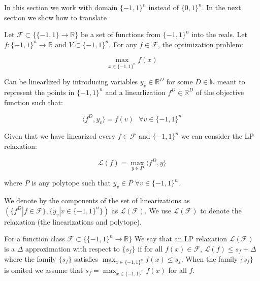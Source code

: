 In this section we work with domain $\{-1,1\}^n$ instead of $\{0,1\}^n$. In the next section we show how to translate 

\begin{definition}[Linearizations] Let $\mathcal{F} \subset \{ \{-1,1\} \rightarrow \mathbb{R}\}$ be a set of functions from $\{-1,1\}^n$ into the reals. Let $f : \{-1, 1\}^n \rightarrow \mathbb{R}$ and $V \subset \{-1, 1\}^n$.  For any $f \in \mathcal{F}$, the optimization problem:

\begin{equation}
\max_{x \in \{-1,1\}^n} f(x)
\end{equation}

Can be linearlized by introducing variables $y_v \in \mathbb{R}^D$ for some $D \in \mathbb{N}$ meant to represent the points in $\{-1,1\}^n$ and a linearlization $f^D \in \mathbb{R}^D$ of the objective function such that:

\begin{equation}
\langle f^D, y_v \rangle = f(v) \text{ } \forall v \in \{-1,1\}^n
\end{equation}

Given that we have linearized every $f \in \mathcal{F}$ and $\{-1,1\}^n$ we can consider the LP relaxation:

\begin{equation}
\mathcal{L}(f) = \max_{y \in P} \langle f^D, y \rangle
\end{equation}

where $P$ is any polytope such that $y_v \in P$ $\forall v \in \{-1,1\}^n$.

We denote by the components of the set of linearizations as $(\{f^D | f \in \mathcal{F}\}, \{y_v | v\in \{-1,1\}^n\})$ as $\mathcal{L}(\mathcal{F})$. We use $\mathcal{L}(\mathcal{F})$ to denote the relaxation (the linearizations and polytope).
\end{definition}


\begin{definition} For a function class $\mathcal{F} \subset \{ \{-1,1\}^n \rightarrow \mathbb{R} \}$ We say that an LP relaxation $\mathcal{L}(\mathcal{F})$ is a $\Delta$ approximation with respect to $\{s_f\}$ if for all $f(x) \in \mathcal{F}$, $\mathcal{L}(f) \leq s_f+\Delta$ where the family $\{s_f\}$ satisfies $\max_{x \in \{-1,1\}^n} f(x) \leq s_f$. When the family $\{s_f\}$ is omited we assume that $s_f = \max_{x \in \{-1,1\}^n} f(x)$ for all $f$.
\end{definition}

